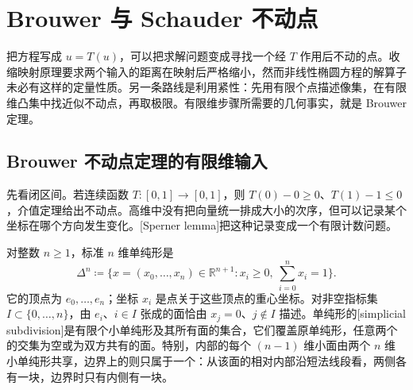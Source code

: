 \section{Brouwer 与 Schauder 不动点}
\label{b2:sec:H203}

把方程写成 \(u=T(u)\)，可以把求解问题变成寻找一个经 \(T\) 作用后不动的点。收缩映射原理要求两个输入的距离在映射后严格缩小，然而非线性椭圆方程的解算子未必有这样的定量性质。另一条路线是利用紧性：先用有限个点描述像集，在有限维凸集中找近似不动点，再取极限。有限维步骤所需要的几何事实，就是 Brouwer 定理。

\subsection{Brouwer 不动点定理的有限维输入}
\label{b2:subsec:H20301}

先看闭区间。若连续函数 \(T:[0,1]\to[0,1]\)，则 \(T(0)-0\ge0\)、\(T(1)-1\le0\)，介值定理给出不动点。高维中没有把向量统一排成大小的次序，但可以记录某个坐标在哪个方向发生变化。[Sperner lemma]把这种记录变成一个有限计数问题。

\ProseParagraphBreak
对整数 \(n\ge1\)，标准 \(n\) 维单纯形是
\[
 \Delta^n\coloneqq\{x=(x_0,\ldots,x_n)\in\mathbb R^{n+1}:x_i\ge0,\ \sum_{i=0}^n x_i=1\}.
\]
它的顶点为 \(e_0,\ldots,e_n\)；坐标 \(x_i\) 是点关于这些顶点的重心坐标。对非空指标集 \(I\subset\{0,\ldots,n\}\)，由 \(e_i\)、\(i\in I\) 张成的面恰由 \(x_j=0\)、\(j\notin I\) 描述。单纯形的[simplicial subdivision]是有限个小单纯形及其所有面的集合，它们覆盖原单纯形，任意两个的交集为空或为双方共有的面。特别，内部的每个 \((n-1)\) 维小面由两个 \(n\) 维小单纯形共享，边界上的则只属于一个：从该面的相对内部沿短法线段看，两侧各有一块，边界时只有内侧有一块。


